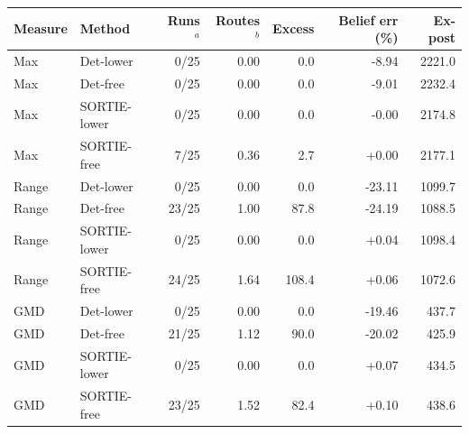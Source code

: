 \begin{tabular}{llrrrrr}\toprule
Measure & Method & Runs$^a$ & Routes$^b$ & Excess & Belief err (\%) & Ex-post \\
\midrule
Max & Det-lower & 0/25 & 0.00 & 0.0 & -8.94 & 2221.0 \\
Max & Det-free & 0/25 & 0.00 & 0.0 & -9.01 & 2232.4 \\
Max & SORTIE-lower & 0/25 & 0.00 & 0.0 & -0.00 & 2174.8 \\
Max & SORTIE-free & 7/25 & 0.36 & 2.7 & +0.00 & 2177.1 \\
Range & Det-lower & 0/25 & 0.00 & 0.0 & -23.11 & 1099.7 \\
Range & Det-free & 23/25 & 1.00 & 87.8 & -24.19 & 1088.5 \\
Range & SORTIE-lower & 0/25 & 0.00 & 0.0 & +0.04 & 1098.4 \\
Range & SORTIE-free & 24/25 & 1.64 & 108.4 & +0.06 & 1072.6 \\
GMD & Det-lower & 0/25 & 0.00 & 0.0 & -19.46 & 437.7 \\
GMD & Det-free & 21/25 & 1.12 & 90.0 & -20.02 & 425.9 \\
GMD & SORTIE-lower & 0/25 & 0.00 & 0.0 & +0.07 & 434.5 \\
GMD & SORTIE-free & 23/25 & 1.52 & 82.4 & +0.10 & 438.6 \\
\bottomrule
\end{tabular}
